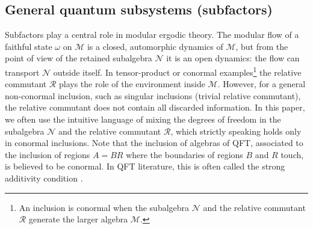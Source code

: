 \documentclass[a4paper,11pt]{article}
\theoremstyle{definition}
\newcommand{\mR}{\mathcal{R}}
\newcommand{\mN}{\mathcal{N}}
\newcommand{\mM}{\mathcal{M}}
\begin{document}
\subsection{General quantum subsystems (subfactors)}
\label{subsec:quantum-coarse}

Subfactors play a central role in modular ergodic theory. The modular flow of a faithful state $\omega$ on $\mM$ is a closed, automorphic dynamics of $\mM$, but from the point of view of the retained subalgebra $\mN$ it is an open dynamics: the flow can transport $\mN$ outside itself. In tensor-product or conormal examples\footnote{An inclusion is conormal when the subalgebra $\mN$ and the relative commutant $\mR$ generate the larger algebra $\mM$.} the relative commutant $\mR$ plays the role of the environment inside $\mM$. However, for a general non-conormal inclusion, such as singular inclusions (trivial relative commutant), the relative commutant does not contain all discarded information. In this paper, we often use the intuitive language of mixing the degrees of freedom in the subalgebra $\mN$ and the relative commutant $\mR$, which strictly speaking holds only in conormal inclusions. Note that the inclusion of algebras of QFT, associated to the inclusion of regions $A=BR$ where the boundaries of regions $B$ and $R$ touch, is believed to be conormal. In QFT literature, this is often called the strong additivity condition \cite{wiesbrock1994note,Guido1998}.
\end{document}
